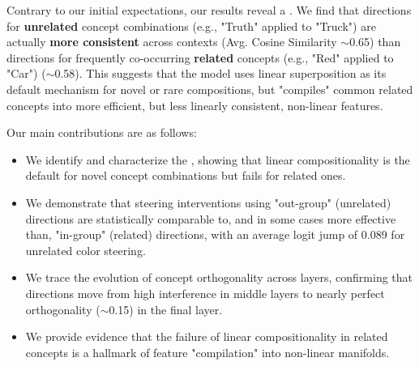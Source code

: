 Contrary to our initial expectations, our results reveal a \textbf{\consistencyparadox}. We find that directions for \textbf{unrelated} concept combinations (e.g., "Truth" applied to "Truck") are actually \textbf{more consistent} across contexts (Avg. Cosine Similarity $\sim$0.65) than directions for frequently co-occurring \textbf{related} concepts (e.g., "Red" applied to "Car") ($\sim$0.58). This suggests that the model uses linear superposition as its default mechanism for novel or rare compositions, but "compiles" common related concepts into more efficient, but less linearly consistent, non-linear features.

Our main contributions are as follows:
\begin{itemize}[leftmargin=*,itemsep=0pt,topsep=0pt]
    \item We identify and characterize the \textbf{\consistencyparadox}, showing that linear compositionality is the default for novel concept combinations but fails for related ones.
    \item We demonstrate that steering interventions using "out-group" (unrelated) directions are statistically comparable to, and in some cases more effective than, "in-group" (related) directions, with an average logit jump of 0.089 for unrelated color steering.
    \item We trace the evolution of concept orthogonality across layers, confirming that directions move from high interference in middle layers to nearly perfect orthogonality ($\sim$0.15) in the final layer.
    \item We provide evidence that the failure of linear compositionality in related concepts is a hallmark of feature "compilation" into non-linear manifolds.
\end{itemize}
